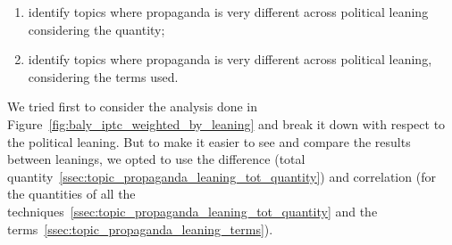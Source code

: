 \begin{enumerate}
    \item identify topics where propaganda is very different across political leaning considering the quantity;
    \item identify topics where propaganda is very different across political leaning, considering the terms used.
\end{enumerate}

We tried first to consider the analysis done in Figure~\ref{fig:baly_iptc_weighted_by_leaning} and break it down with respect to the political leaning. But to make it easier to see and compare the results between leanings, we opted to use the difference (total quantity~\ref{ssec:topic_propaganda_leaning_tot_quantity}) and correlation (for the quantities of all the techniques~\ref{ssec:topic_propaganda_leaning_tot_quantity} and the terms~\ref{ssec:topic_propaganda_leaning_terms}). 











